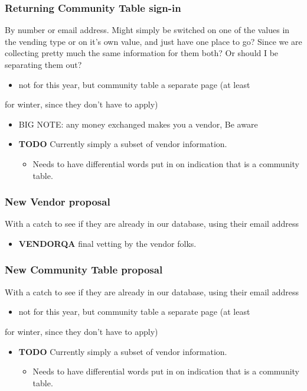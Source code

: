 \documentclass[captions=tablesignature]{scrartcl}
\begin{document}
\subsubsection{Returning Community Table sign-in}
\label{sec-3-1-2}
By number or email address.  Might simply be switched on one of
the values in the vending type or on it's own value, and just have
one place to go?  Since we are collecting pretty much the same
information for them both?  Or should I be separating them out?
\begin{itemize}
\item not for this year, but community table a separate page (at least
\end{itemize}
for winter, since they don't have to apply)
\begin{itemize}
\item BIG NOTE: any money exchanged makes you a vendor, Be aware
\end{itemize}
\begin{itemize}
\item {\bfseries\sffamily TODO} Currently simply a subset of vendor information.
\label{sec-3-1-2-1}
\begin{itemize}
\item Needs to have differential words put in on indication that is a
community table.
\end{itemize}
\end{itemize}

\subsubsection{New Vendor proposal}
\label{sec-3-1-3}
With a catch to see if they are already in our database, using
their email address
\begin{itemize}
\item {\bfseries\sffamily VENDORQA} final vetting by the vendor folks.
\label{sec-3-1-3-1}
\end{itemize}

\subsubsection{New Community Table proposal}
\label{sec-3-1-4}
With a catch to see if they are already in our database, using
their email address
\begin{itemize}
\item not for this year, but community table a separate page (at least
\end{itemize}
for winter, since they don't have to apply)
\begin{itemize}
\item {\bfseries\sffamily TODO} Currently simply a subset of vendor information.
\label{sec-3-1-4-1}
\begin{itemize}
\item Needs to have differential words put in on indication that is a
community table.
\end{itemize}
\end{itemize}
\end{document}
